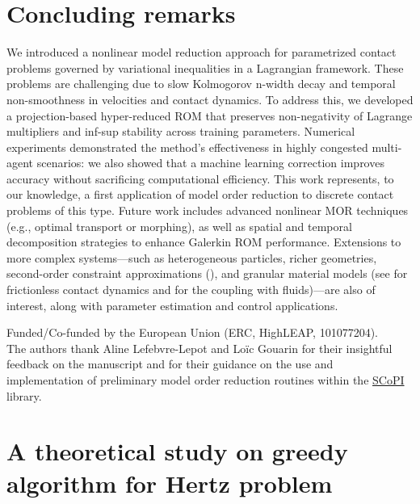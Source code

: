 \section{Concluding remarks}
\label{sec:conclusions}
We introduced a nonlinear model reduction approach for parametrized contact problems governed by variational inequalities in a Lagrangian framework. These problems are challenging due to slow Kolmogorov n-width decay and temporal non-smoothness in velocities and contact dynamics. To address this, we developed a projection-based hyper-reduced ROM that preserves non-negativity of Lagrange multipliers and inf-sup stability across training parameters. Numerical experiments demonstrated the method’s effectiveness in highly congested multi-agent scenarios: we also showed that a machine learning correction improves accuracy without sacrificing computational efficiency. This work represents, to our knowledge, a first application of model order reduction to discrete contact problems of this type. Future work includes advanced nonlinear MOR techniques (e.g., optimal transport or morphing), as well as spatial and temporal decomposition strategies to enhance Galerkin ROM performance. Extensions to more complex systems—such as heterogeneous particles, richer geometries, second-order constraint approximations (\cite{bloch2023convex}), and granular material models (see \cite{moreau1996numerical} for frictionless contact dynamics and \cite{verdon2010contact} for the coupling with fluids)—are also of interest, along with parameter estimation and control applications.


\begin{acknowledgements}
Funded/Co-funded by the European Union (ERC, HighLEAP, 101077204).\\
The authors thank Aline Lefebvre-Lepot and Loïc Gouarin for their insightful feedback on the manuscript and for their guidance on the use and implementation of preliminary model order reduction routines within the \href{https://lefebvre-lepot.perso.math.cnrs.fr/SCoPI/}{SCoPI} library.
\end{acknowledgements}


%
%
\appendix
\section{A theoretical study on greedy algorithm for Hertz problem}
\label{sec:hertz_appendix}

